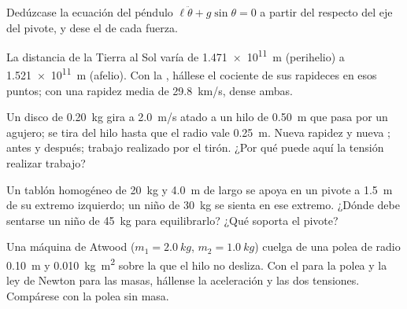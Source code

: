 \begin{exercise}[$\star\star$]\label{exo:b1:angular-momentum:5}
Dedúzcase la ecuación del péndulo $\ell\ddot\theta + g\sin\theta = 0$ a
partir del  respecto del eje del pivote, y dese
el  de cada fuerza.
\end{exercise}

\begin{exercise}[$\star\star$]\label{exo:b1:angular-momentum:6}
La distancia de la Tierra al Sol varía de \qty{1.471e11}{m} (perihelio) a
\qty{1.521e11}{m} (afelio). Con la , hállese el cociente
de sus rapideces en esos puntos; con una rapidez media de \qty{29.8}{km/s},
dense ambas.
\end{exercise}

\begin{exercise}[$\star\star$]\label{exo:b1:angular-momentum:7}
Un disco de \qty{0.20}{kg} gira a \qty{2.0}{m/s} atado a un hilo de
\qty{0.50}{m} que pasa por un agujero; se tira del hilo hasta que el radio
vale \qty{0.25}{m}. Nueva rapidez y nueva ;  antes y después; trabajo realizado por el tirón. ¿Por qué puede
aquí la tensión realizar trabajo?
\end{exercise}

\begin{exercise}[$\star\star$]\label{exo:b1:angular-momentum:8}
Un tablón homogéneo de \qty{20}{kg} y \qty{4.0}{m} de largo se apoya en un
pivote a \qty{1.5}{m} de su extremo izquierdo; un niño de \qty{30}{kg} se
sienta en ese extremo. ¿Dónde debe sentarse un niño de \qty{45}{kg} para
equilibrarlo? ¿Qué soporta el pivote?
\end{exercise}

\begin{exercise}[$\star\star$]\label{exo:b1:angular-momentum:9}
Una máquina de Atwood ($m_1 = \qty{2.0}{kg}$, $m_2 = \qty{1.0}{kg}$) cuelga
de una polea de radio \qty{0.10}{m} y  \qty{0.010}{kg.m^2}
sobre la que el hilo no desliza. Con el  para
la polea y la ley de Newton para las masas, hállense la aceleración y las
dos tensiones. Compárese con la polea sin masa.
\end{exercise}

